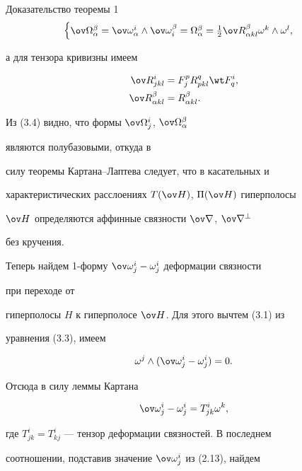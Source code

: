 \begin{pf*}{Доказательство теоремы 1}
\begin{equation}
\begin{cases}
\ov\Omega^\beta_\alpha=\ov\omega^i_\alpha\wedge\ov\omega^\beta_i= 


\Omega^\beta_\alpha=\frac{1}{2}\ov R^\beta_{\alpha kl}\omega^k\wedge 


\omega^l, 


\end{cases} 


\end{equation} 


а для тензора кривизны имеем 


\begin{align} 


\ov R^i_{jkl}&=F^p_j R^q_{pkl}\wt F^i_q, \\ 


\ov R^\beta_{\alpha kl}&=R^\beta_{\alpha kl}. 


\end{align} 


Из (3.4) видно, что формы $\ov\Omega^i_j$, $\ov\Omega^\beta_\alpha$ 


являются полубазовыми, откуда в 


силу теоремы Картана--Лаптева \cite{9} следует, что в касательных и 


характеристических расслоениях $T(\ov H)$, $\Pi(\ov H)$ гиперполосы 


$\ov H$ определяются аффинные связности $\ov\nabla$, $\ov\nabla^\bot$ 


без кручения. 


\end{pf*} 


 


Теперь найдем 1-форму $\ov\omega^i_j-\omega^i_j$ деформации связности 


при переходе от 


гиперполосы $H$ к гиперполосе $\ov H$. Для этого вычтем (3.1) из 


уравнения (3.3), имеем 


$$ 


\omega^j\wedge(\ov\omega^i_j-\omega^i_j)=0. 


$$ 


Отсюда в силу леммы Картана 


$$ 


\ov\omega^i_j-\omega^i_j=T^i_{jk}\omega^k, 


$$ 


где $T^i_{jk}=T^i_{kj}$ --- тензор деформации связностей. В последнем 


соотношении, подставив значение $\ov\omega^i_j$ из (2.13), найдем 


